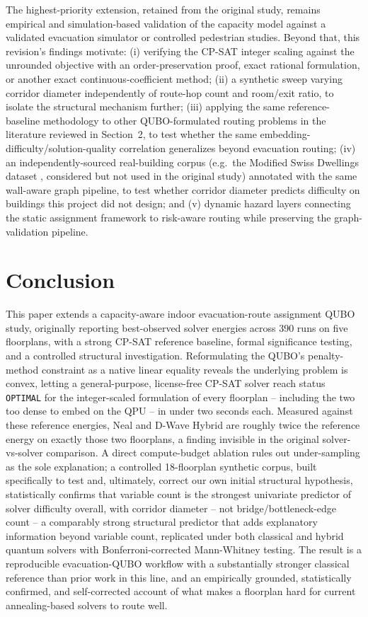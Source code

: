 \documentclass[11pt]{article}
\begin{document}
The highest-priority extension, retained from the original study, remains empirical and simulation-based validation of the capacity model against a validated evacuation simulator or controlled pedestrian studies. Beyond that, this revision's findings motivate: (i) verifying the CP-SAT integer scaling against the unrounded objective with an order-preservation proof, exact rational formulation, or another exact continuous-coefficient method; (ii) a synthetic sweep varying corridor diameter independently of route-hop count and room/exit ratio, to isolate the structural mechanism further; (iii) applying the same reference-baseline methodology to other QUBO-formulated routing problems in the literature reviewed in Section~2, to test whether the same embedding-difficulty/solution-quality correlation generalizes beyond evacuation routing; (iv) an independently-sourced real-building corpus (e.g.\ the Modified Swiss Dwellings dataset \cite{msd}, considered but not used in the original study) annotated with the same wall-aware graph pipeline, to test whether corridor diameter predicts difficulty on buildings this project did not design; and (v) dynamic hazard layers connecting the static assignment framework to risk-aware routing while preserving the graph-validation pipeline.

\section{Conclusion}

This paper extends a capacity-aware indoor evacuation-route assignment QUBO study, originally reporting best-observed solver energies across 390 runs on five floorplans, with a strong CP-SAT reference baseline, formal significance testing, and a controlled structural investigation. Reformulating the QUBO's penalty-method constraint as a native linear equality reveals the underlying problem is convex, letting a general-purpose, license-free CP-SAT solver reach status \texttt{OPTIMAL} for the integer-scaled formulation of every floorplan -- including the two too dense to embed on the QPU -- in under two seconds each. Measured against these reference energies, Neal and D-Wave Hybrid are roughly twice the reference energy on exactly those two floorplans, a finding invisible in the original solver-vs-solver comparison. A direct compute-budget ablation rules out under-sampling as the sole explanation; a controlled 18-floorplan synthetic corpus, built specifically to test and, ultimately, correct our own initial structural hypothesis, statistically confirms that variable count is the strongest univariate predictor of solver difficulty overall, with corridor diameter -- not bridge/bottleneck-edge count -- a comparably strong structural predictor that adds explanatory information beyond variable count, replicated under both classical and hybrid quantum solvers with Bonferroni-corrected Mann-Whitney testing. The result is a reproducible evacuation-QUBO workflow with a substantially stronger classical reference than prior work in this line, and an empirically grounded, statistically confirmed, and self-corrected account of what makes a floorplan hard for current annealing-based solvers to route well.
\end{document}
